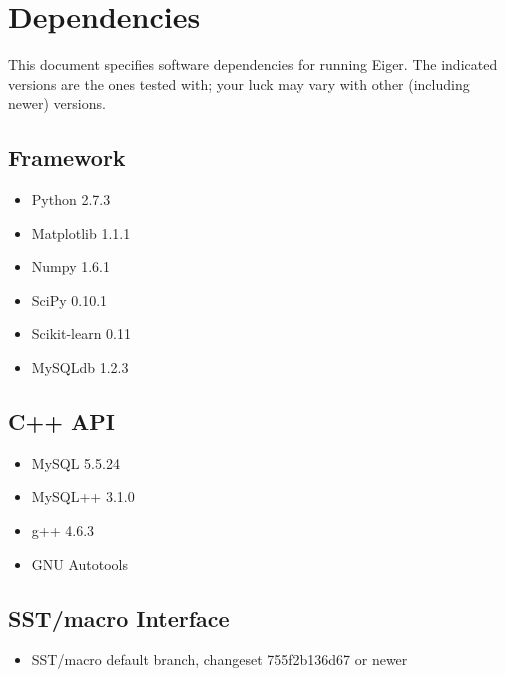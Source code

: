 \section{Dependencies}
\label{sec:dep}
This document specifies software dependencies for running Eiger. 
The indicated versions are the ones tested with; your luck may 
vary with other (including newer) versions.

\subsection{Framework}
\begin{itemize}
\item Python 2.7.3
\item Matplotlib 1.1.1
\item Numpy 1.6.1
\item SciPy 0.10.1
\item Scikit-learn 0.11
\item MySQLdb 1.2.3
\end{itemize}

\subsection{C++ API}
\begin{itemize}
\item MySQL 5.5.24
\item MySQL++ 3.1.0
\item g++ 4.6.3
\item GNU Autotools
\end{itemize}

\subsection{SST/macro Interface}
\begin{itemize}
\item SST/macro default branch, changeset 755f2b136d67 or newer
\end{itemize}
